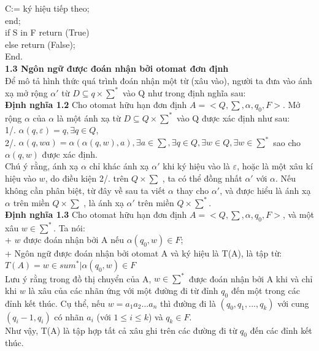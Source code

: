\begin{flushleft}
\hspace{30mm} C:= ký hiệu tiếp theo;\\
\hspace{20mm} end;\\
\hspace{10mm} if S in F return (True)\\
\hspace{10mm} else return (False);\\
End.\\
\textbf{1.3 Ngôn ngữ được đoán nhận bởi otomat đơn định}\\
Để mô tả hình thức quá trình đoán nhận một từ (xâu vào), người ta đưa vào ánh xạ mở rộng $\alpha'$ từ $D \subseteq q \times \sum^*$ vào Q như trong định nghĩa sau: \\
\textbf{Định nghĩa 1.2} Cho otomat hữu hạn đơn định $A = <Q, \sum, \alpha, q_0, F>$. Mở rộng $\alpha$ của $\alpha$ là một ánh xạ từ $D \subseteq Q \times \sum^*$ vào Q được xác định như sau: \\
1/. $\alpha(q, \varepsilon) = q, \exists q \in Q$,\\
2/. $\alpha(q, wa) = \alpha(\alpha(q, w), a), \exists a \in \sum, \exists q\in Q, \exists w \in Q, \exists w \in \sum^*$ sao cho $\alpha(q, w)$ được xác định.\\
Chú ý rằng, ánh xạ $\alpha$ chỉ khác ánh xạ $\alpha'$ khi ký hiệu vào là $\varepsilon$, hoặc là một xâu kí hiệu vào $w$, do điều kiện 2/. trên $Q \times \sum$ , ta có thể đồng nhất $\alpha'$ với $\alpha$. Nếu không cần phân biệt, từ đây về sau ta viết $\alpha$ thay cho $\alpha'$, và được hiểu là ánh xạ $\alpha$ trên miền $Q \times \sum$ , là ánh xạ $\alpha'$ trên miền $Q \times \sum^*$.\\
\textbf{Định nghĩa 1.3} Cho otomat hữu hạn đơn định $A = <Q, \sum, \alpha, q_0, F>$, và một xâu $w \in \sum^*$. Ta nói:\\
+ $w$ được đoán nhận bởi A nếu $\alpha(q_0, w) \in F$;\\
+ Ngôn ngữ được đoán nhận bởi otomat A và ký hiệu là T(A), là tập từ:\\
$T(A) = {w \in sum^* | \alpha(q_0, w) \in F}$\\
Lưu ý rằng trong đồ thị chuyển của A, $w \in \sum^*$ được đoán nhận bởi A khi và chỉ khi $w$ là xâu của các nhãn ứng với một đường đi từ đỉnh $q_0$ đến một trong các đỉnh kết thúc. Cụ thể, nếu $w= a_1a_2...a_n$ thì đường đi là $(q_0, q_1,..., q_k)$ với cung $(q_i-1, q_i)$ có nhãn $a_i$ (với $1 \le i \le k$) và $q_k \in F$.\\
Như vậy, T(A) là tập hợp tất cả xâu ghi trên các đường đi từ $q_0$ đến các đỉnh kết thúc.\\

\end{flushleft}

